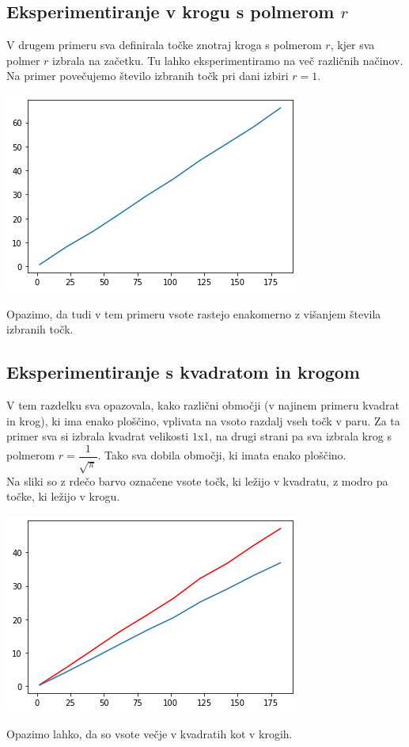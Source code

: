 \documentclass[12pt, a4paper]{article}
\begin{document}
\subsection{Eksperimentiranje v krogu s polmerom $r$}
V drugem primeru sva definirala točke znotraj kroga s polmerom $r$, kjer sva polmer $r$ izbrala na začetku. Tu lahko eksperimentiramo na več različnih načinov.
Na primer povečujemo število izbranih točk pri dani izbiri $r = 1$.
\begin{center}
\includegraphics{krog_s_danim_polmerom.png}
\end{center}
Opazimo, da tudi v tem primeru vsote rastejo enakomerno z višanjem števila izbranih točk.
	
\newpage

\subsection{Eksperimentiranje s kvadratom in krogom}
V tem razdelku sva opazovala, kako različni območji (v najinem primeru kvadrat in krog), ki ima enako ploščino, vplivata na vsoto razdalj vseh točk v paru. Za ta primer sva si izbrala kvadrat velikosti $1$x$1$, na drugi strani pa sva izbrala krog s polmerom $ r=\dfrac{1}{\sqrt{\pi}}$. Tako sva dobila območji, ki imata enako ploščino.\\

Na sliki so z rdečo barvo označene vsote točk, ki ležijo v kvadratu, z modro pa točke, ki ležijo v krogu.\\
\begin{center}
\includegraphics{primerjava_krog_kvadrat.png}
\end{center}
Opazimo lahko, da so vsote večje v kvadratih kot v krogih.\\
\end{document}
